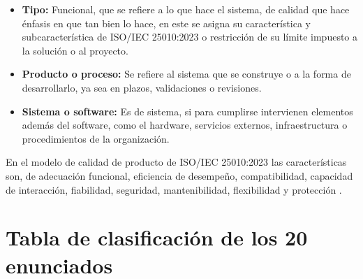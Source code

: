 \documentclass[conference,onecolumn]{IEEEtran}
\begin{document}
\begin{itemize}
\item \textbf{Tipo:} Funcional, que se refiere a lo que hace el sistema, de calidad que hace énfasis en que tan bien lo hace, en este se asigna su característica y subcaracterística de ISO/IEC 25010:2023 \cite{iso25010} o restricción de su límite impuesto a la solución o al proyecto.
\item \textbf{Producto o proceso:} Se refiere al sistema que se construye o a la forma de desarrollarlo, ya sea en plazos, validaciones o revisiones.
\item \textbf{Sistema o software:} Es de sistema, si para cumplirse intervienen elementos además del software, como el hardware, servicios externos, infraestructura o procedimientos de la organización.
\end{itemize}

En el modelo de calidad de producto de ISO/IEC 25010:2023 las características son, de adecuación funcional, eficiencia de desempeño, compatibilidad, capacidad de interacción, fiabilidad, seguridad, mantenibilidad, flexibilidad y protección \cite{iso25010}.

\clearpage
\section{Tabla de clasificación de los 20 enunciados}
\end{document}

